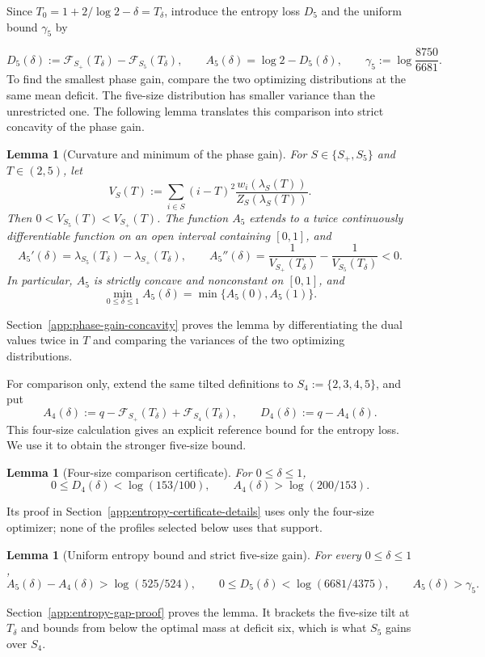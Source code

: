 \documentclass[a4paper,10pt,reqno]{amsart}
\numberwithin{equation}{section}
\theoremstyle{plain}
\newtheorem{lemma}[theorem]{Lemma}
\theoremstyle{remark}
\begin{document}
Since $T_0=1+2/{\log 2}-\delta=T_\delta$, introduce the entropy loss
$D_5$ and the uniform bound $\gamma_5$ by

\[
  D_5(\delta):=\mathcal F_{S_+}(T_\delta)
               -\mathcal F_{S_5}(T_\delta),\qquad
  A_5(\delta)=\log 2-D_5(\delta),\qquad
  \gamma_5:=\log\frac{8750}{6681}.                            \tag{5.2}
  \label{eq:phase-function-definition}
\]
To find the smallest phase gain, compare the two optimizing distributions
at the same mean deficit. The five-size distribution has smaller variance
than the unrestricted one. The following lemma translates this comparison
into strict concavity of the phase gain.

\begin{lemma}[Curvature and minimum of the phase gain]
\label{lem:phase-gain-concavity}
For $S\in\{S_+,S_5\}$ and $T\in(2,5)$, let
\[
 V_S(T):=\sum_{i\in S}(i-T)^2
 \frac{w_i(\lambda_S(T))}{Z_S(\lambda_S(T))}.
\]
Then $0<V_{S_5}(T)<V_{S_+}(T)$. The function $A_5$ extends to a twice
continuously differentiable function on an open interval containing $[0,1]$,
and
\[
 A_5'(\delta)=\lambda_{S_5}(T_\delta)-\lambda_{S_+}(T_\delta),
 \qquad
 A_5''(\delta)=\frac1{V_{S_+}(T_\delta)}
               -\frac1{V_{S_5}(T_\delta)}<0.
\]
In particular, $A_5$ is strictly concave and nonconstant on $[0,1]$, and
\[
 \min_{0\le\delta\le1}A_5(\delta)
 =\min\{A_5(0),A_5(1)\}.
\]
\end{lemma}

Section~\ref{app:phase-gain-concavity} proves the lemma by differentiating
the dual values twice in $T$ and comparing the variances of the two
optimizing distributions.


For comparison only, extend the same tilted definitions to
$S_4:=\{2,3,4,5\}$, and put
\[
 A_4(\delta):=q-\mathcal F_{S_+}(T_\delta)+\mathcal F_{S_4}(T_\delta),
 \qquad D_4(\delta):=q-A_4(\delta).
\]
This four-size calculation gives an explicit reference bound for the
entropy loss. We use it to obtain the stronger five-size bound.
\begin{lemma}[Four-size comparison certificate]
\label{lem:four-size-entropy-certificate}
For $0\le\delta\le1$,
\[
 0\le D_4(\delta)<\log(153/100),\qquad A_4(\delta)>\log(200/153).
\]
\end{lemma}
Its proof in Section~\ref{app:entropy-certificate-details} uses only the
four-size optimizer; none of the profiles selected below uses that support.

\begin{lemma}[Uniform entropy bound and strict five-size gain]
\label{lem:entropy-gap}
For every $0\le\delta\le1$,
\[
 A_5(\delta)-A_4(\delta)>\log(525/524),\qquad
 0\le D_5(\delta)<\log(6681/4375),\qquad A_5(\delta)>\gamma_5.
 \tag{5.3}
\]
\end{lemma}
Section~\ref{app:entropy-gap-proof} proves the lemma. It brackets the
five-size tilt at $T_\delta$ and bounds from below the optimal mass at
deficit six, which is what $S_5$ gains over $S_4$.
\end{document}
